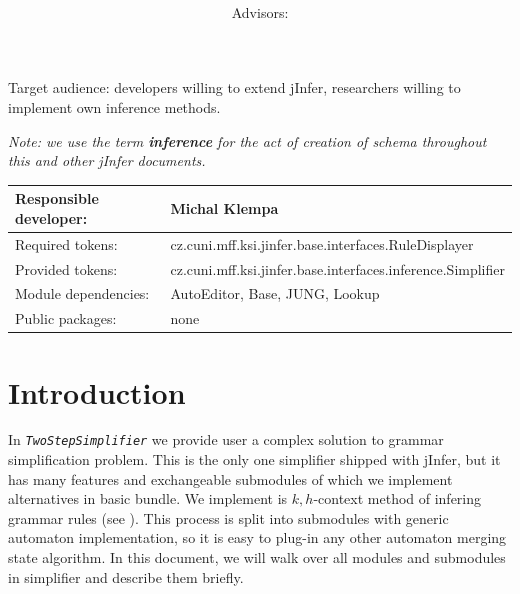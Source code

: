 \documentclass[a4paper,10pt,oneside]{article}
\title{\bf\mftitle}
\author{\mfauthor \\ Advisors: \mfadvisor}
\date{\mfplacedate}
\newcommand{\jmodule}[1]{\texttt{\textit{#1}}}
\begin{document}


\maketitle
\noindent Target audience: developers willing to extend jInfer, researchers willing to implement own inference methods.

\noindent \emph{Note: we use the term \textbf{inference} for the act of creation of schema throughout this and other jInfer documents.}

\noindent \begin{tabular}{|l|l|} \hline
Responsible developer: & Michal Klempa \\ \hline
Required tokens:       & cz.cuni.mff.ksi.jinfer.base.interfaces.RuleDisplayer \\ \hline
Provided tokens:       & cz.cuni.mff.ksi.jinfer.base.interfaces.inference.Simplifier \\ \hline
Module dependencies:   & AutoEditor, Base, JUNG, Lookup \\ \hline
Public packages:       & none \\ \hline
\end{tabular}

\section{Introduction}
In \jmodule{TwoStepSimplifier} we provide user a complex solution to grammar simplification problem.
This is the only one simplifier shipped with jInfer, but it has many features and exchangeable submodules of which we implement alternatives in basic bundle.
We implement is $k,h$-context method of infering grammar rules (see \cite{ahonen}).
This process is split into submodules with generic automaton implementation, so it is easy to plug-in any other automaton merging state algorithm.
In this document, we will walk over all modules and submodules in simplifier and describe them briefly.

\end{document}
